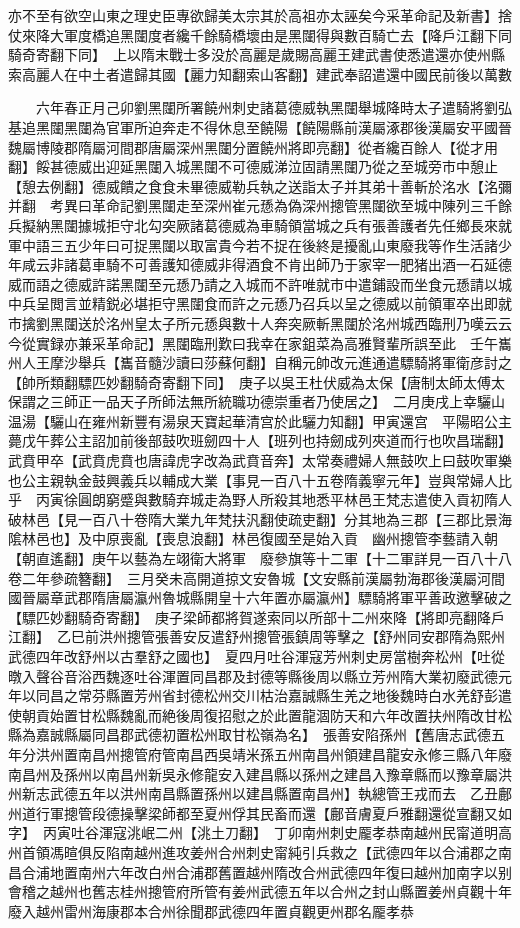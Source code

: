 亦不至有欲空山東之理史臣專欲歸美太宗其於高祖亦太誣矣今采革命記及新書】捨仗來降大軍度橋追黑闥度者纔千餘騎橋壞由是黑闥得與數百騎亡去【降戶江翻下同騎奇寄翻下同】　上以隋末戰士多没於高麗是歲賜高麗王建武書使悉遣還亦使州縣索高麗人在中土者遣歸其國【麗力知翻索山客翻】建武奉詔遣還中國民前後以萬數

　　六年春正月己卯劉黑闥所署饒州刺史諸葛德威執黑闥舉城降時太子遣騎將劉弘基追黑闥黑闥為官軍所迫奔走不得休息至饒陽【饒陽縣前漢屬涿郡後漢屬安平國晉魏屬博陵郡隋屬河間郡唐屬深州黑闥分置饒州將即亮翻】從者纔百餘人【從才用翻】餒甚德威出迎延黑闥入城黑闥不可德威涕泣固請黑闥乃從之至城旁市中憩止【憩去例翻】德威饋之食食未畢德威勒兵執之送詣太子并其弟十善斬於洺水【洺彌并翻　考異曰革命記劉黑闥走至深州崔元愻為偽深州摠管黑闥欲至城中陳列三千餘兵擬納黑闥據城拒守北勾突厥諸葛德威為車騎領當城之兵有張善護者先任鄉長來就軍中語三五少年曰可捉黑闥以取富貴今若不捉在後終是擾亂山東廢我等作生活諸少年咸云非諸葛車騎不可善護知德威非得酒食不肯出師乃于家宰一肥猪出酒一石延德威而語之德威許諾黑闥至元愻乃請之入城而不許唯就市中遣鋪設而坐食元愻請以城中兵呈閲言並精鋭必堪拒守黑闥食而許之元愻乃召兵以呈之德威以前領軍卒出即就市擒劉黑闥送於洺州皇太子所元愻與數十人奔突厥斬黑闥於洺州城西臨刑乃嘆云云今從實録亦兼采革命記】黑闥臨刑歎曰我幸在家鉏菜為高雅賢輩所誤至此　壬午巂州人王摩沙舉兵【巂音髓沙讀曰莎蘇何翻】自稱元帥改元進通遣驃騎將軍衛彦討之【帥所類翻驃匹妙翻騎奇寄翻下同】　庚子以吳王杜伏威為太保【唐制太師太傅太保謂之三師正一品天子所師法無所統職功德崇重者乃使居之】　二月庚戌上幸驪山温湯【驪山在雍州新豐有湯泉天寶起華清宫於此驪力知翻】甲寅還宫　平陽昭公主薨戊午葬公主詔加前後部鼓吹班劒四十人【班列也持劒成列夾道而行也吹昌瑞翻】武賁甲卒【武賁虎賁也唐諱虎字改為武賁音奔】太常奏禮婦人無鼓吹上曰鼓吹軍樂也公主親執金鼓興義兵以輔成大業【事見一百八十五卷隋義寧元年】豈與常婦人比乎　丙寅徐圓朗窮蹙與數騎弃城走為野人所殺其地悉平林邑王梵志遣使入貢初隋人破林邑【見一百八十卷隋大業九年梵扶汎翻使疏吏翻】分其地為三郡【三郡比景海隂林邑也】及中原喪亂【喪息浪翻】林邑復國至是始入貢　幽州摠管李藝請入朝【朝直遙翻】庚午以藝為左翊衛大將軍　廢參旗等十二軍【十二軍詳見一百八十八卷二年參疏簪翻】　三月癸未高開道掠文安魯城【文安縣前漢屬勃海郡後漢屬河間國晉屬章武郡隋唐屬瀛州魯城縣開皇十六年置亦屬瀛州】驃騎將軍平善政邀擊破之【驃匹妙翻騎奇寄翻】　庚子梁師都將賀遂索同以所部十二州來降【將即亮翻降戶江翻】　乙巳前洪州摠管張善安反遣舒州摠管張鎮周等擊之【舒州同安郡隋為熙州武德四年改舒州以古羣舒之國也】　夏四月吐谷渾寇芳州刺史房當樹奔松州【吐從暾入聲谷音浴西魏逐吐谷渾置同昌郡及封德等縣後周以縣立芳州隋大業初廢武德元年以同昌之常芬縣置芳州省封德松州交川枯治嘉誠縣生羌之地後魏時白水羌舒彭遣使朝貢始置甘松縣魏亂而絶後周復招慰之於此置龍涸防天和六年改置扶州隋改甘松縣為嘉誠縣屬同昌郡武德初置松州取甘松嶺為名】　張善安陷孫州【舊唐志武德五年分洪州置南昌州摠管府管南昌西吳靖米孫五州南昌州領建昌龍安永修三縣八年廢南昌州及孫州以南昌州新吳永修龍安入建昌縣以孫州之建昌入豫章縣而以豫章屬洪州新志武德五年以洪州南昌縣置孫州以建昌縣置南昌州】執總管王戎而去　乙丑鄜州道行軍摠管段德操擊梁師都至夏州俘其民畜而還【鄜音膚夏戶雅翻還從宣翻又如字】　丙寅吐谷渾寇洮岷二州【洮土刀翻】　丁卯南州刺史龎孝恭南越州民甯道明高州首領馮暄俱反陷南越州進攻姜州合州刺史甯純引兵救之【武德四年以合浦郡之南昌合浦地置南州六年改白州合浦郡舊置越州隋改合州武德四年復曰越州加南字以别會稽之越州也舊志桂州摠管府所管有姜州武德五年以合州之封山縣置姜州貞觀十年廢入越州雷州海康郡本合州徐聞郡武德四年置貞觀更州郡名龎孝恭